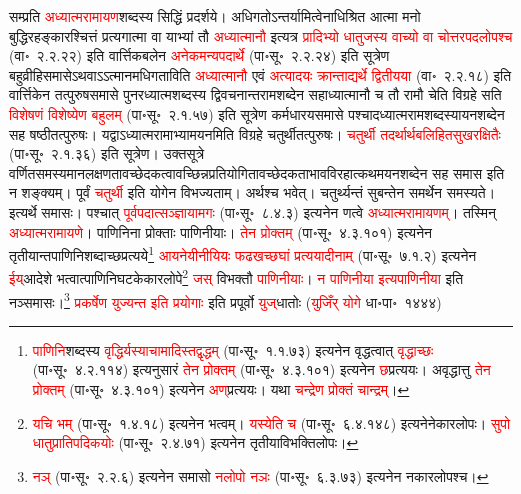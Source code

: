 \begin{sloppypar}\justifying\noindent\hspace{10mm} सम्प्रति \textcolor{red}{अध्यात्म\-रामायण}\-शब्दस्य सिद्धिं प्रदर्शये। अधिगतोऽन्तर्यामित्वेनाधिश्रित आत्मा मनो बुद्धिरहङ्कारश्चित्तं प्रत्यगात्मा वा याभ्यां तौ \textcolor{red}{अध्यात्मानौ} इत्यत्र \textcolor{red}{प्रादिभ्यो धातुजस्य वाच्यो वा चोत्तर\-पद\-लोपश्च} (वा॰~२.२.२२) इति वार्त्तिक\-बलेन \textcolor{red}{अनेकमन्य\-पदार्थे} (पा॰सू॰~२.२.२४) इति सूत्रेण बहुव्रीहि\-समासेऽथवाऽऽत्मानमधिगताविति \textcolor{red}{अध्यात्मानौ} एवं \textcolor{red}{अत्यादयः क्रान्ताद्यर्थे द्वितीयया} (वा॰~२.२.१८) इति वार्त्तिकेन तत्पुरुष\-समासे पुनरध्यात्म\-शब्दस्य द्विवचनान्त\-राम\-शब्देन सहाध्यात्मानौ च तौ रामौ चेति विग्रहे सति \textcolor{red}{विशेषणं विशेष्येण बहुलम्‌} (पा॰सू॰~२.१.५७) इति सूत्रेण कर्मधारय\-समासे पश्चादध्यात्म\-राम\-शब्दस्यायन\-शब्देन सह षष्ठी\-तत्पुरुषः। यद्वाऽध्यात्म\-रामाभ्यामयनमिति विग्रहे चतुर्थी\-तत्पुरुषः। \textcolor{red}{चतुर्थी तदर्थार्थ\-बलि\-हित\-सुख\-रक्षितैः} (पा॰सू॰~२.१.३६) इति सूत्रेण। उक्त\-सूत्रे वर्णित\-समस्यमान\-लक्षणतावच्छेदकत्वावच्छिन्न\-प्रतियोगितावच्छेदकताभाव\-विरहात्कथमयन\-शब्देन सह समास इति न शङ्क्यम्। पूर्वं \textcolor{red}{चतुर्थी} इति योगेन विभज्यताम्। अर्थश्च भवेत्। चतुर्थ्यन्तं सुबन्तेन समर्थेन समस्यते। इत्यर्थे समासः। पश्चात् \textcolor{red}{पूर्वपदात्सञ्ज्ञायामगः} (पा॰सू॰~८.४.३) इत्यनेन णत्वे \textcolor{red}{अध्यात्म\-रामायणम्‌}। तस्मिन् \textcolor{red}{अध्यात्म\-रामायणे}। पाणिनिना प्रोक्ताः पाणिनीयाः। \textcolor{red}{तेन प्रोक्तम्‌} (पा॰सू॰~४.३.१०१) इत्यनेन तृतीयान्त\-पाणिनि\-शब्दाच्छप्रत्यये\footnote{\textcolor{red}{पाणिनि}\-शब्दस्य \textcolor{red}{वृद्धिर्यस्याचामादिस्तद्वृद्धम्} (पा॰सू॰~१.१.७३) इत्यनेन वृद्धत्वात् \textcolor{red}{वृद्धाच्छः} (पा॰सू॰~४.२.११४) इत्यनुसारं \textcolor{red}{तेन प्रोक्तम्‌} (पा॰सू॰~४.३.१०१) इत्यनेन \textcolor{red}{छ}\-प्रत्ययः। अवृद्धात्तु \textcolor{red}{तेन प्रोक्तम्‌} (पा॰सू॰~४.३.१०१) इत्यनेन \textcolor{red}{अण्‌}\-प्रत्ययः। यथा \textcolor{red}{चन्द्रेण प्रोक्तं चान्द्रम्}।} \textcolor{red}{आयनेयीनीयियः फढखच्छघां प्रत्ययादीनाम्‌} (पा॰सू॰~७.१.२) इत्यनेन \textcolor{red}{ईय्‌}\-आदेशे भत्वात्पाणिनि\-घटकेकार\-लोपे\footnote{\textcolor{red}{यचि भम्‌} (पा॰सू॰~१.४.१८) इत्यनेन भत्वम्। \textcolor{red}{यस्येति च} (पा॰सू॰~६.४.१४८) इत्यनेनेकार\-लोपः। \textcolor{red}{सुपो धातु\-प्रातिपदिकयोः} (पा॰सू॰~२.४.७१) इत्यनेन तृतीया\-विभक्ति\-लोपः।} \textcolor{red}{जस्‌} विभक्तौ \textcolor{red}{पाणिनीयाः}। \textcolor{red}{न पाणिनीया इत्यपाणिनीया} इति नञ्समासः।\footnote{\textcolor{red}{नञ्‌} (पा॰सू॰~२.२.६) इत्यनेन समासो \textcolor{red}{नलोपो नञः} (पा॰सू॰~६.३.७३) इत्यनेन नकार\-लोपश्च।} \textcolor{red}{प्रकर्षेण युज्यन्त इति प्रयोगाः} इति प्रपूर्वो \textcolor{red}{युज्‌}\-धातोः (\textcolor{red}{युजिँर् योगे} धा॰पा॰~१४४४)

\end{sloppypar}
